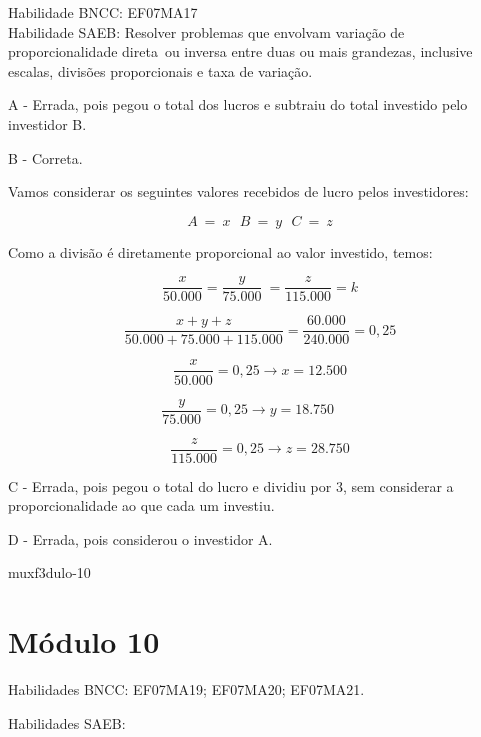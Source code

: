 {Habilidade BNCC: EF07MA17\\
Habilidade SAEB: Resolver problemas que envolvam variação de
proporcionalidade direta~ou inversa entre duas ou mais grandezas,
inclusive escalas, divisões proporcionais e taxa de variação.

A - Errada, pois pegou o total dos lucros e subtraiu do total investido
pelo investidor B.

B - Correta.

Vamos considerar os seguintes valores recebidos de lucro pelos
investidores:

\[A\  = \ x\text{\ \ \ \ \ \ \ \ \ \ \ \ \ \ \ \ \ \ \ \ }B\  = \ y\text{\ \ \ \ \ \ \ \ \ \ \ \ \ \ \ \ \ \ \ \ }C\  = \ z\]

Como a divisão é diretamente proporcional ao valor investido, temos:

\[\frac{x}{50.000} = \frac{y}{75.000}\  = \frac{z}{115.000} = k\]

\[\frac{x + y + z}{50.000 + 75.000 + 115.000} = \frac{60.000}{240.000} = 0,25\]

\[\frac{x}{50.000} = 0,25 \rightarrow x = 12.500\]

\[\ \frac{y}{75.000} = 0,25 \rightarrow y = 18.750\ \ \ \ \ \ \ \ \ \]

\[\frac{z}{115.000} = 0,25 \rightarrow z = 28.750\]

C - Errada, pois pegou o total do lucro e dividiu por 3, sem considerar
a proporcionalidade ao que cada um investiu.

D - Errada, pois considerou o investidor A.

muxf3dulo-10}{%
\section{Módulo 10}

Habilidades BNCC: EF07MA19; EF07MA20; EF07MA21.

Habilidades SAEB:

}
